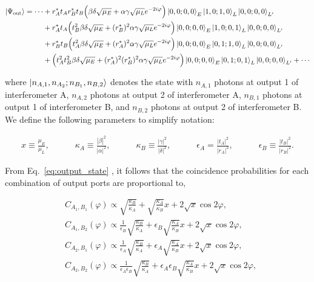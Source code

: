 \documentclass[11pt]{caltech_thesis} %
\begin{document}
\hypertarget{eq:output_state}{}{
\begin{align}
    \ket{\Psi_{\text{out}}}= %
    \cdots&+r_A^*t_A r_B^*t_B\Big(\beta \delta\sqrt{\mu_E}+\alpha \gamma \sqrt{\mu_L} e^{-2i\varphi}  \Big)\ket{0,0;0,0}_E\ket{1,0;1,0}_L\ket{0,0;0,0}_{L^\prime}\label{eq: output_state}\\
    &+r_A^*t_A\Big(t_B^2  \beta\delta \sqrt{\mu_E} + (r_B^*)^2  \alpha \gamma \sqrt{\mu_L} e^{-2i\varphi}\Big)\ket{0,0;0,0}_E\ket{1,0;0,1}_L\ket{0,0;0,0}_{L^\prime} \nonumber\\
    &+r_B^*t_B\Big(t_A^2\beta \delta\sqrt{\mu_E}  +(r_A^*)^2 \alpha \gamma  \sqrt{\mu_L} e^{-2i\varphi}\Big)\ket{0,0;0,0}_E\ket{0,1;1,0}_L\ket{0,0;0,0}_{L^\prime} \nonumber\\
    &+\Big(t_A^2 t_B^2\beta \delta\sqrt{\mu_E} + (r_A^*)^2 (r_B^*)^2 \alpha \gamma \sqrt{\mu_L} e^{-2i\varphi}\Big)\ket{0,0;0,0}_E\ket{0,1;0,1}_L\ket{0,0;0,0}_{L^\prime} + \cdots \nonumber 
\end{align}
}

where $\ket{n_{A,1},n_{A_2};n_{B_1}, n_{B,2}}$ denotes the state with $n_{A,1}$ photons at output 1 of interferometer A, $n_{A,2}$ photons at output 2 of interferometer A, $n_{B,1}$ photons at output 1 of interferometer B, and $n_{B,2}$ photons at output 2 of interferometer B. We define the following parameters to simplify notation:

\begin{align}
    x \equiv \frac{\mu_E}{\mu_L},\quad\quad\quad
    \kappa_A \equiv \frac{|\beta|^2}{|\alpha|^2}, \quad\quad\quad \kappa_B \equiv \frac{|\gamma|^2}{|\delta|^2},\quad\quad\quad \epsilon_A = \frac{|t_A|^2}{|r_A|^2}, \quad\quad\quad \epsilon_B \equiv \frac{|t_B|^2}{|r_B|^2}.
\end{align}

From Eq.~\ref{eq:output_state} , it follows that the coincidence probabilities for each combination of output ports are proportional to,

\begin{align}
    &C_{A_1, B_1}(\varphi) \propto \sqrt{\frac{\kappa_B}{\kappa_A}}+\sqrt{\frac{\kappa_A}{\kappa_B}}x+2\sqrt{x}\cos{2\varphi},\\
    &C_{A_1, B_2}(\varphi) \propto \frac{1}{\epsilon_B}\sqrt{\frac{\kappa_B}{\kappa_A}}+\epsilon_B\sqrt{\frac{\kappa_A}{\kappa_B}}x+2\sqrt{x}\cos{2\varphi},\\
    &C_{A_2, B_1}(\varphi) \propto \frac{1}{\epsilon_A}\sqrt{\frac{\kappa_B}{\kappa_A}}+\epsilon_A\sqrt{\frac{\kappa_A}{\kappa_B}}x+2\sqrt{x}\cos{2\varphi},\\
    &C_{A_2, B_2}(\varphi) \propto  \frac{1}{\epsilon_A\epsilon_B}\sqrt{\frac{\kappa_B}{\kappa_A}}+\epsilon_A\epsilon_B\sqrt{\frac{\kappa_A}{\kappa_B}}x+2\sqrt{x}\cos{2\varphi},
\end{align}
\end{document}
